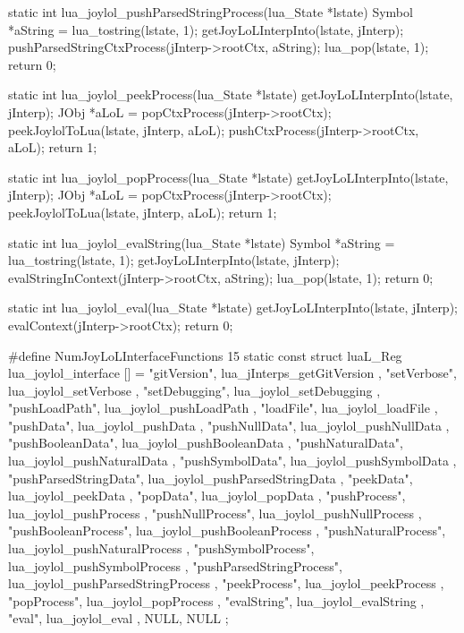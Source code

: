 static int lua_joylol_pushParsedStringProcess(lua_State *lstate) {
  Symbol *aString = lua_tostring(lstate, 1);
  getJoyLoLInterpInto(lstate, jInterp);
  pushParsedStringCtxProcess(jInterp->rootCtx, aString);
  lua_pop(lstate, 1);
  return 0;
}

static int lua_joylol_peekProcess(lua_State *lstate) {
  getJoyLoLInterpInto(lstate, jInterp);
  JObj *aLoL = popCtxProcess(jInterp->rootCtx);
  peekJoylolToLua(lstate, jInterp, aLoL);
  pushCtxProcess(jInterp->rootCtx, aLoL);
  return 1;
}

static int lua_joylol_popProcess(lua_State *lstate) {
  getJoyLoLInterpInto(lstate, jInterp);
  JObj *aLoL = popCtxProcess(jInterp->rootCtx);
  peekJoylolToLua(lstate, jInterp, aLoL);
  return 1;
}

static int lua_joylol_evalString(lua_State *lstate) {
  Symbol *aString = lua_tostring(lstate, 1);
  getJoyLoLInterpInto(lstate, jInterp);
  evalStringInContext(jInterp->rootCtx, aString);
  lua_pop(lstate, 1);
  return 0;
}

static int lua_joylol_eval(lua_State *lstate) {
  getJoyLoLInterpInto(lstate, jInterp);
  evalContext(jInterp->rootCtx);
  return 0;
}

#define NumJoyLoLInterfaceFunctions 15
static const struct luaL_Reg lua_joylol_interface [] = {
  { "gitVersion",              lua_jInterps_getGitVersion         },
  { "setVerbose",              lua_joylol_setVerbose              },
  { "setDebugging",            lua_joylol_setDebugging            },
  { "pushLoadPath",            lua_joylol_pushLoadPath            },
  { "loadFile",                lua_joylol_loadFile                },
  { "pushData",                lua_joylol_pushData                },
  { "pushNullData",            lua_joylol_pushNullData            },
  { "pushBooleanData",         lua_joylol_pushBooleanData         },
  { "pushNaturalData",         lua_joylol_pushNaturalData         },
  { "pushSymbolData",          lua_joylol_pushSymbolData          },
  { "pushParsedStringData",    lua_joylol_pushParsedStringData    },
  { "peekData",                lua_joylol_peekData                },
  { "popData",                 lua_joylol_popData                 },
  { "pushProcess",             lua_joylol_pushProcess             },
  { "pushNullProcess",         lua_joylol_pushNullProcess         },
  { "pushBooleanProcess",      lua_joylol_pushBooleanProcess      },
  { "pushNaturalProcess",      lua_joylol_pushNaturalProcess      },
  { "pushSymbolProcess",       lua_joylol_pushSymbolProcess       },
  { "pushParsedStringProcess", lua_joylol_pushParsedStringProcess },
  { "peekProcess",             lua_joylol_peekProcess             },
  { "popProcess",              lua_joylol_popProcess              },
  { "evalString",              lua_joylol_evalString              },
  { "eval",                    lua_joylol_eval                    },
  {NULL, NULL}
};
\stopCCode
